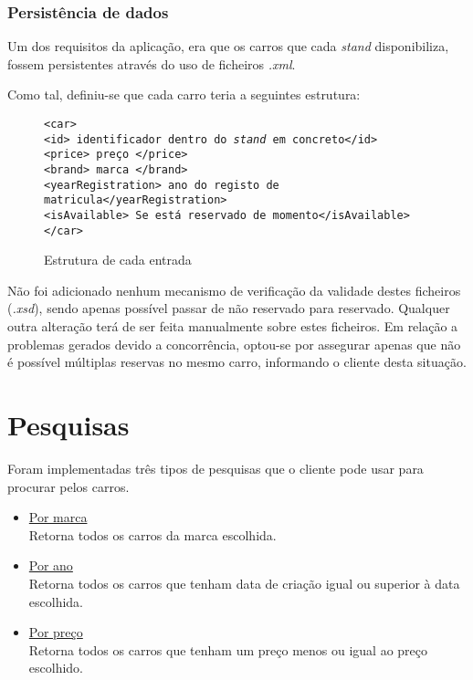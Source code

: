 \documentclass[a4paper]{article}
\begin{document}
\subsubsection{Persistência de dados}

Um dos requisitos da aplicação, era que os carros que cada \emph{stand} disponibiliza, fossem persistentes através do uso de ficheiros \emph{.xml}. 

Como tal, definiu-se que cada carro teria a seguintes estrutura:

\begin{figure}[H]
	\begin{framed}
		\texttt{<car> \\
					\hspace*{5mm}<id> identificador dentro do \emph{stand} em concreto</id> \\
					\hspace*{5mm}<price> preço </price>\\
					\hspace*{5mm}<brand> marca </brand>\\
					\hspace*{5mm}<yearRegistration> ano do registo de matricula</yearRegistration>\\
					\hspace*{5mm}<isAvailable> Se está reservado de momento</isAvailable>\\
			    </car>
		}		
	\end{framed}
	\caption{Estrutura de cada entrada}
  \label{fig:httpHeaderReq}
\end{figure}

Não foi adicionado nenhum mecanismo de verificação da validade destes ficheiros (\emph{.xsd}), sendo apenas possível passar de não reservado para reservado. Qualquer outra alteração terá de ser feita manualmente sobre estes ficheiros.
Em relação a problemas gerados devido a concorrência, optou-se por assegurar apenas que não é possível múltiplas reservas no mesmo carro, informando o cliente desta situação.

\newpage

\section{Pesquisas}
Foram implementadas três tipos de pesquisas que o cliente pode usar para procurar pelos carros.

\begin{itemize}

\item
\underline{Por marca}\\
Retorna todos os carros da marca escolhida.

\item
\underline{Por ano}\\
Retorna todos os carros que tenham data de criação igual ou superior à data escolhida.

\item
\underline{Por preço}\\
Retorna todos os carros que tenham um preço menos ou igual ao preço escolhido.
\end{itemize}
\end{document}
